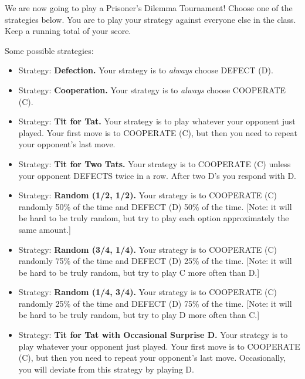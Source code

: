 We are now going to play a Prisoner's Dilemma Tournament! Choose one of the strategies below. You are to play your strategy against everyone else in the class. Keep a running total of your score. %

Some possible strategies:

\begin{itemize}
\item Strategy: {\bf Defection.} Your strategy is to {\it always} choose DEFECT (D).
\vspace{.2in}
\item Strategy: {\bf Cooperation.} Your strategy is to {\it always} choose COOPERATE (C).
\vspace{.2in}
\item Strategy: {\bf Tit for Tat.} Your strategy is to play whatever your opponent just played. Your first move is to COOPERATE (C), but then you need to repeat your opponent's last move. 
\vspace{.2in}

\item Strategy: {\bf Tit for Two Tats.} Your strategy is to COOPERATE (C) unless your opponent DEFECTS twice in a row. After two D's you respond with D. 
\vspace{.2in}

\item Strategy: {\bf Random (1/2, 1/2).} Your strategy is to COOPERATE (C) randomly 50\% of the time and DEFECT (D) 50\% of the time. [Note: it will be hard to be truly random, but try to play each option approximately the same amount.]
\vspace{.2in}

\item Strategy: {\bf Random (3/4, 1/4).} Your strategy is to COOPERATE (C) randomly 75\% of the time and DEFECT (D) 25\% of the time. [Note: it will be hard to be truly random, but try to play C more often than D.]
\vspace{.2in}

\item Strategy: {\bf Random (1/4, 3/4).} Your strategy is to COOPERATE (C) randomly 25\% of the time and DEFECT (D) 75\% of the time. [Note: it will be hard to be truly random, but try to play D more often than C.]
\vspace{.2in}

\item Strategy: {\bf Tit for Tat with Occasional Surprise D.} Your strategy is to play whatever your opponent just played. Your first move is to COOPERATE (C), but then you need to repeat your opponent's last move. Occasionally, you will deviate from this strategy by playing D.
\vspace{.2in}



\end{itemize}
